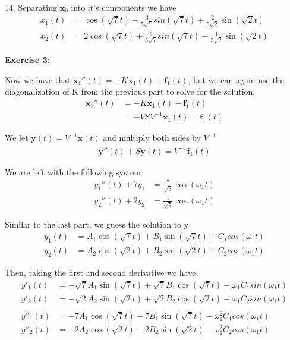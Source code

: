\documentclass[12pt]{article}
\begin{document}
14. Separating $\mathbf{x}_0$ into it's components we have
\begin{align*}
    x_1(t) & = \cos(\sqrt{7}t) + \frac{3}{5\sqrt{7}}sin(\sqrt{7}t) + \frac{2}{5\sqrt{2}}\sin(\sqrt{2}t)  \\
    x_2(t) & = 2\cos(\sqrt{7}t) + \frac{6}{5\sqrt{7}}sin(\sqrt{7}t) - \frac{1}{5\sqrt{2}}\sin(\sqrt{2}t)
\end{align*}

\noindent{}\textbf{Exercise 3:}

Now we have that $\mathbf{x}_1''(t) = -K\mathbf{x}_1(t) + \mathbf{f}_1(t)$,
but we can again use the diagonalization of K from the previous part to solve for the solution,
\begin{align*}
    \mathbf{x}_1''(t) & = -K\mathbf{x}_1(t) + \mathbf{f}_1(t)        \\
                      & = -VSV^{-1}\mathbf{x}_1(t) = \mathbf{f}_1(t)
\end{align*}

We let $\mathbf{y}(t) = V^{-1}\mathbf{x}(t)$ and multiply both sides by $V^{-1}$
\begin{align*}
    \mathbf{y}''(t) + S\mathbf{y}(t) = V^{-1}\mathbf{f}_1(t)
\end{align*}

We are left with the following system
\begin{align*}
    y_1''(t) + 7y_1 & = \frac{7}{\sqrt{5}} \cos(\omega_{1}t) \\
    y_2''(t) + 2y_2 & = \frac{1}{\sqrt{5}} \cos(\omega_{1}t)
\end{align*}

Similar to the last part, we guess the solution to y
\begin{align*}
    y_1(t) & = A_1\cos(\sqrt{7}t) + B_1\sin(\sqrt{7}t) + C_1cos(\omega_{1}t) \\
    y_2(t) & = A_2\cos(\sqrt{2}t) + B_2\sin(\sqrt{2}t) + C_2cos(\omega_{1}t)
\end{align*}

Then, taking the first and second derivative we have
\begin{align*}
    y'_1(t)  & = -\sqrt{7}A_1\sin(\sqrt{7}t) + \sqrt{7}B_1\cos(\sqrt{7}t) - \omega_{1} C_1 sin(\omega_{1}t) \\
    y'_2(t)  & = -\sqrt{2}A_2\sin(\sqrt{2}t) + \sqrt{2}B_2\cos(\sqrt{2}t) - \omega_{1} C_2 sin(\omega_{1}t) \\\\
    y''_1(t) & = -7A_1\cos(\sqrt{7}t) - 7B_1\sin(\sqrt{7}t) - \omega_{1}^2 C_1cos(\omega_{1}t)              \\
    y''_2(t) & = -2A_2\cos(\sqrt{2}t) - 2B_2\sin(\sqrt{2}t) - \omega_{1}^2 C_2cos(\omega_{1}t)
\end{align*}
\end{document}
